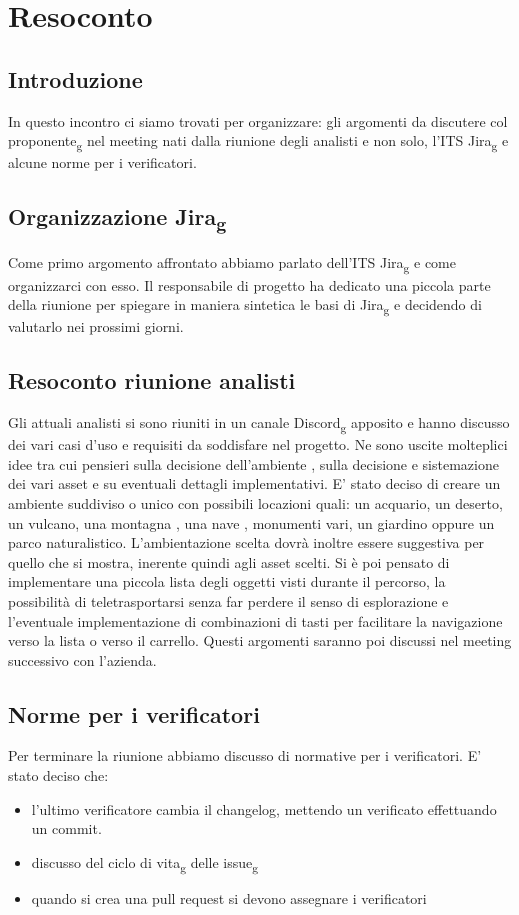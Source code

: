 \section{Resoconto}
\subsection{Introduzione}
In questo incontro ci siamo trovati per organizzare: gli argomenti da discutere col proponente\textsubscript{g} nel meeting nati dalla riunione degli analisti e non solo, l'ITS Jira\textsubscript{g} e alcune norme per i verificatori.   

\subsection{Organizzazione Jira\textsubscript{g}}
Come primo argomento affrontato abbiamo parlato dell'ITS Jira\textsubscript{g} e come organizzarci con esso. Il responsabile di progetto ha dedicato una piccola parte della riunione per spiegare in maniera sintetica le basi di Jira\textsubscript{g} e decidendo di valutarlo nei prossimi giorni.

\subsection{Resoconto riunione analisti}
Gli attuali analisti si sono riuniti in un canale Discord\textsubscript{g} apposito e hanno discusso dei vari casi d'uso e requisiti da soddisfare nel progetto.
Ne sono uscite molteplici idee tra cui pensieri sulla decisione dell'ambiente , sulla decisione e sistemazione dei vari asset e su eventuali dettagli implementativi. E' stato deciso di creare un ambiente suddiviso o unico con possibili locazioni quali: un acquario, un deserto, un vulcano, una montagna , una nave , monumenti vari, un giardino oppure un parco naturalistico. L'ambientazione scelta dovrà inoltre essere suggestiva per quello che si mostra, inerente quindi agli asset scelti.
Si è poi pensato di implementare una piccola lista degli oggetti visti durante il percorso, la possibilità di teletrasportarsi senza far perdere il senso di esplorazione e l'eventuale implementazione di combinazioni di tasti per facilitare la navigazione verso la lista o verso il carrello.  
Questi argomenti saranno poi discussi nel meeting successivo con l'azienda.

\subsection{Norme per i verificatori}
Per terminare la riunione abbiamo discusso di normative per i verificatori. E' stato deciso che:
\begin{itemize}
	\item l'ultimo verificatore cambia il changelog, mettendo un verificato effettuando un commit.
	\item discusso del ciclo di vita\textsubscript{g} delle issue\textsubscript{g}
	\item quando si crea una pull request si devono assegnare i verificatori
\end{itemize} 
 

